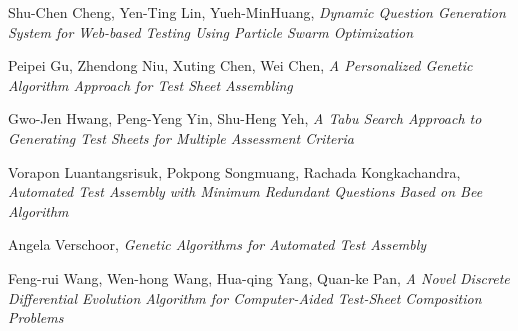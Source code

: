 \documentclass{llncs}
\begin{document}
\begin{thebibliography}{99}

 Shu-Chen Cheng, Yen-Ting Lin, Yueh-MinHuang, \textit{Dynamic Question Generation System for Web-based Testing Using Particle Swarm Optimization}

 Peipei Gu, Zhendong Niu, Xuting Chen, Wei Chen, \textit{A Personalized Genetic Algorithm Approach for Test Sheet Assembling}

 Gwo-Jen Hwang, Peng-Yeng Yin, Shu-Heng Yeh, \textit{A Tabu Search Approach to Generating Test Sheets for Multiple Assessment Criteria}

 Vorapon Luantangsrisuk, Pokpong Songmuang, Rachada Kongkachandra, \textit{Automated Test Assembly with Minimum Redundant Questions Based on Bee Algorithm}

 Angela Verschoor, \textit{Genetic Algorithms for Automated Test Assembly}

 Feng-rui Wang, Wen-hong Wang, Hua-qing Yang, Quan-ke Pan, \textit{A Novel Discrete Differential Evolution Algorithm for Computer-Aided Test-Sheet Composition Problems}

\end{thebibliography}
\end{document}
